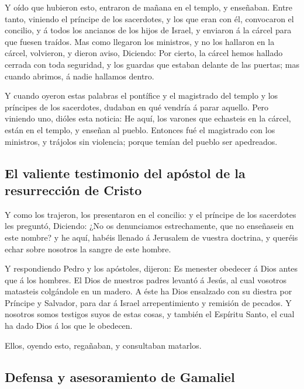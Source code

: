  Y oído que hubieron esto, entraron de mañana en el templo,
y enseñaban. Entre tanto, viniendo el príncipe de los sacerdotes, y los
que eran con él, convocaron el concilio, y á todos los ancianos de los
hijos de Israel, y enviaron á la cárcel para que fuesen traídos.
 Mas como llegaron los ministros, y no los hallaron en la
cárcel, volvieron, y dieron aviso,  Diciendo: Por cierto,
la cárcel hemos hallado cerrada con toda seguridad, y los guardas que
estaban delante de las puertas; mas cuando abrimos, á nadie hallamos
dentro.

 Y cuando oyeron estas palabras el pontífice y el
magistrado del templo y los príncipes de los sacerdotes, dudaban en qué
vendría á parar aquello.  Pero viniendo uno, dióles esta
noticia: He aquí, los varones que echasteis en la cárcel, están en el
templo, y enseñan al pueblo.  Entonces fué el magistrado
con los ministros, y trájolos sin violencia; porque temían del pueblo
ser apedreados.

\hypertarget{el-valiente-testimonio-del-apuxf3stol-de-la-resurrecciuxf3n-de-cristo}{%
\subsection{El valiente testimonio del apóstol de la resurrección de
Cristo}\label{el-valiente-testimonio-del-apuxf3stol-de-la-resurrecciuxf3n-de-cristo}}

 Y como los trajeron, los presentaron en el concilio: y el
príncipe de los sacerdotes les preguntó,  Diciendo: ¿No os
denunciamos estrechamente, que no enseñaseis en este nombre? y he aquí,
habéis llenado á Jerusalem de vuestra doctrina, y queréis echar sobre
nosotros la sangre de este hombre.

 Y respondiendo Pedro y los apóstoles, dijeron: Es menester
obedecer á Dios antes que á los hombres.  El Dios de
nuestros padres levantó á Jesús, al cual vosotros matasteis colgándole
en un madero.  A éste ha Dios ensalzado con su diestra por
Príncipe y Salvador, para dar á Israel arrepentimiento y remisión de
pecados.  Y nosotros somos testigos suyos de estas cosas, y
también el Espíritu Santo, el cual ha dado Dios á los que le obedecen.

 Ellos, oyendo esto, regañaban, y consultaban matarlos.

\hypertarget{defensa-y-asesoramiento-de-gamaliel}{%
\subsection{Defensa y asesoramiento de
Gamaliel}\label{defensa-y-asesoramiento-de-gamaliel}}

